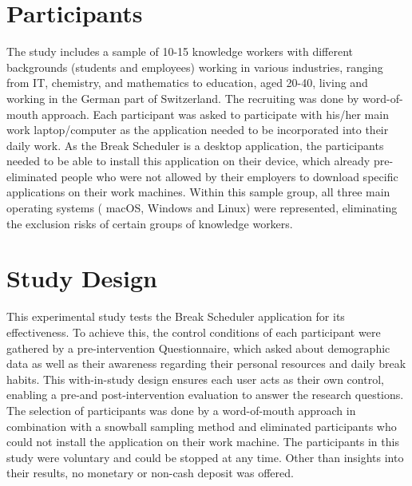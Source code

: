 \documentclass{hasel_thesis}
\begin{document}
\section{Participants}
\begin{comment} 
- Description of the sample size, criteria for inclusion/exclusion, and demographics of the participants
\end{comment}
 The study includes a sample of 10-15 knowledge workers with different backgrounds (students and employees) working in various industries, ranging from IT, chemistry, and mathematics to education, aged 20-40, living and working in the German part of Switzerland. The recruiting was done by word-of-mouth approach. Each participant was asked to participate with his/her main work laptop/computer as the application needed to be incorporated into their daily work. As the Break Scheduler is a desktop application, the participants needed to be able to install this application on their device, which already pre-eliminated people who were not allowed by their employers to download specific applications on their work machines. Within this sample group, all three main operating systems ( macOS, Windows and Linux) were represented, eliminating the exclusion risks of certain groups of knowledge workers.

\section{Study Design}
\begin{comment} 
- Explanation of the experimental design, including control and intervention groups, pre- and post-tests, and other relevant details
\end{comment}

This experimental study tests the Break Scheduler application for its effectiveness. To achieve this, the control conditions of each participant were gathered by a pre-intervention Questionnaire, which asked about demographic data as well as their awareness regarding their personal resources and daily break habits. This with-in-study design ensures each user acts as their own control, enabling a pre-and post-intervention evaluation to answer the research questions. The selection of participants was done by a word-of-mouth approach in combination with a snowball sampling method and eliminated participants who could not install the application on their work machine. The participants in this study were voluntary and could be stopped at any time. Other than insights into their results, no monetary or non-cash deposit was offered.
\end{document}
